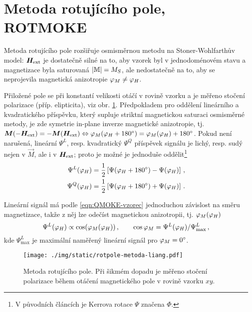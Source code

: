 \section{Metoda rotujícího pole, ROTMOKE}
\label{chap:ROTMOKE}

Metoda rotujícího pole\cite{liangSeparationLinearQuadratic2015,liangQuantitativeStudyQuadratic2015} rozšiřuje osmisměrnou metodu na Stoner-Wohlfarthův model: $\bm{H}_\textrm{ext}$ je dostatečně silné na to, aby vzorek byl v jednodoménovém stavu a magnetizace byla saturovaná $|\mathbb{M}|=M_S$, ale nedostatečně na to, aby se neprojevila magnetická anizotropie $\varphi_M\neq\varphi_H$.

Přiložené pole se při konstantí velikosti otáčí v rovině vzorku a je měřeno stočení polarizace (příp. elipticita), viz obr. \ref{fig:metoda-rotujiciho-pole}.
Předpokladem pro oddělení lineárního a kvadratického příspěvku, který supluje striktní magnetickou saturaci osmisměrné metody,
je zde symetrie in-plane inverze magnetické anizotropie, tj. $\bm{M}(-\bm{H}_\textrm{ext})=-\bm{M}(\bm{H}_\textrm{ext}) \Leftrightarrow \varphi_M(\varphi_H+\SI{180}{\degree})=\varphi_M(\varphi_H)+\SI{180}{\degree}$.
Pokud není narušená, lineární $\Psi^L$, resp. kvadratický $\Psi^Q$ příspěvek signálu je lichý, resp. sudý nejen v $\vec{M}$, ale i v $\bm{H}_\textrm{ext}$;
proto je možné je jednoduše oddělit\footnote{V původních článcích je Kerrova rotace $\Psi$ značena $\Phi$.}
\begin{align}
    \Psi^L(\varphi_H)&=\frac{1}{2} \left[ \Psi(\varphi_H+\SI{180}{\degree}) - \Psi(\varphi_H) \right] 
    \,, \\ \Psi^Q(\varphi_H)&=\frac{1}{2} \left[ \Psi(\varphi_H+\SI{180}{\degree}) + \Psi(\varphi_H) \right] \,.
\end{align}

Lineární signál má podle \eqref{eqn:QMOKE-vzorec} jednoduchou závislost na směru magnetizace, takže z něj lze odečíst magnetickou anizotropii, tj. $\varphi_M(\varphi_H)$
\begin{equation}
    \Psi^L(\varphi_H)\propto \cos(\varphi_M(\varphi_H)) \,, \qquad \cos \varphi_M=\Psi^L(\varphi_H)/\Psi^L_\textrm{max} \,,
\end{equation}
kde $\Psi^L_\textrm{max}$ je maximální naměřený lineární signál pro $\varphi_M=\SI{0}{\degree}$.

\begin{figure}[htbp]
    \centering
    \texttt{[image: ./img/static/rotpole-metoda-liang.pdf]}
    \caption{Metoda rotujícího pole.
    Při šikmém dopadu je měřeno stočení polarizace během otáčení magnetického pole v rovině vzorku $xy$. \cite{liangQuantitativeStudyQuadratic2015}}
    \label{fig:metoda-rotujiciho-pole}
\end{figure}

